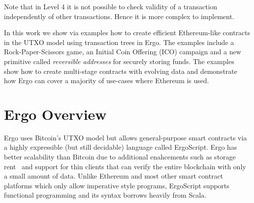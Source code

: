\documentclass[runningheads]{llncs}
\newcommand{\ignore}[1]{}
\newcommand{\langname}{ErgoScript\xspace}
\begin{document}
Note that in Level 4 it is not possible to check validity of a transaction independently of other transactions. Hence it is more complex to implement. 




In this work we show via examples how to create efficient Ethereum-like contracts in the UTXO model using transaction trees in Ergo. 
The examples include a Rock-Paper-Scissors game, an Initial Coin Offering (ICO) campaign and a new primitive called {\em reversible addresses} for securely storing funds. The examples show how to create multi-stage contracts with evolving data and demonstrate how Ergo can cover a majority of use-cases where Ethereum is used.  


\section{Ergo Overview}
\label{ergo-overview}

Ergo uses Bitcoin's UTXO model but allows general-purpose smart contracts via a highly expressible (but still decidable) language called \langname. Ergo has better scalability than Bitcoin due to additional enahcements such as storage rent~\cite{chepurnoy2018systematic} and support for thin clients that can verify the entire blockchain with only a small amount of data. Unlike Ethereum and most other smart contract platforms which only allow imperative style programs, \langname supports functional programming and its syntax borrows heavily from Scala. 

\ignore{
Code in functional style is more compact and easier to understand because it focusses on WHAT (i.e., the actual task at hand), while imperative code focusses on HOW (i.e., on the nitty grittys of task). For example, if we want to find out whether there exists at least one black cat, the code in a hypothetical imperative language (such as Solidity in Ethereum) would look something like the following:
\begin{verbatim}
    bool found = false;
    for (int i = 0; i <= cats.size; i++){
      if (cats[i].color == "black") found = true; 
    }
\end{verbatim}

Somewhat equivalent code in \langname's functional style would look like:

\begin{verbatim}
    def isBlack(cat:Cat) = cat.color == "black"
    val found = cats.exists(isBlack)
\end{verbatim}
}
\end{document}
